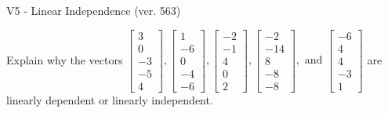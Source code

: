 \begin{exercise}
  \begin{exerciseTitle}V5 - Linear Independence (ver. 563)\end{exerciseTitle}
  \begin{exerciseStatement}
    Explain why the vectors \(\left[\begin{array}{r}
3 \\
0 \\
-3 \\
-5 \\
4
\end{array}\right] , \left[\begin{array}{r}
1 \\
-6 \\
0 \\
-4 \\
-6
\end{array}\right] , \left[\begin{array}{r}
-2 \\
-1 \\
4 \\
0 \\
2
\end{array}\right] , \left[\begin{array}{r}
-2 \\
-14 \\
8 \\
-8 \\
-8
\end{array}\right] , \text{ and } \left[\begin{array}{r}
-6 \\
4 \\
4 \\
-3 \\
1
\end{array}\right]\) are linearly dependent or linearly independent.	



\end{exerciseStatement}
\end{exercise}
